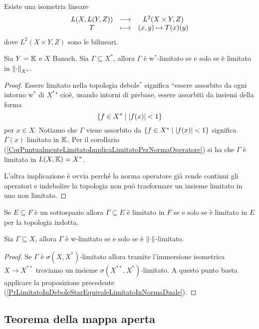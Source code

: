 \begin{exercise}
Esiste una isometria lineare
\[\begin{array}{ccc} {L(X,L(Y,Z))} & \longrightarrow & {L^2(X\times Y,Z)}\\ {T} & \longmapsto & {(x,y)\mapsto T(x)(y)} \end{array}\]
dove $L^2(X\times Y,Z)$ sono le bilineari.
\end{exercise}

\begin{proposition}\label{PrLimitatoInDeboleStarEquivaleLimitatoInNormaDuale}
Sia $Y=\mathbb{K}$ e $X$ Banach. Sia $\Gamma\subseteq X^\ast$, allora $\Gamma$ \`e w$^\ast$-limitato se e solo se \`e limitato in $\left\Vert{\cdot}\right\Vert_{X^\ast}$.
\end{proposition}
\begin{proof}
Essere limitato nella topologia debole$^\ast$ significa ``essere assorbito da ogni intorno w$^\ast$ di $X^\ast$" cio\`e, usando intorni di prebase, essere assorbiti da insiemi della forma
\[\left\{{f\in X^\ast\mid \left|{f(x)}\right|<1}\right\}\]
per $x\in X$. Notiamo che $\Gamma$ viene assorbito da $\left\{{f\in X^\ast\mid \left|{f(x)}\right|<1}\right\}$ significa $\Gamma(x)$ limitato in $\mathbb{K}$. Per il corollario (\ref{CorPuntualmenteLimitatoImplicaLimitatoPerNormaOperatore}) si ha che $\Gamma$ \`e limitato in $L(X,\mathbb{K})=X^\ast$.

L'altra implicazione \`e ovvia perch\'e la norma operatore gi\`a rende continui gli operatori e indebolire la topologia non pu\`o trasformare un insieme limitato in uno non limitato.
\end{proof}

\begin{remark}
Se $E\subseteq F$ \`e un sottospazio allora $\Gamma\subseteq E$ \`e limitato in $F$ se e solo se \`e limitato in $E$ per la topologia indotta.
\end{remark}

\begin{proposition}
Sia $\Gamma\subseteq X$, allora $\Gamma$ \`e w-limitato se e solo se \`e $\left\Vert{\cdot}\right\Vert$-limitato.
\end{proposition}
\begin{proof}
Se $\Gamma$ \`e $\sigma(X,X^\ast)$-limitato allora tramite l'immersione isometrica $X\to X^{\ast\ast}$ troviamo un insieme $\sigma(X^{\ast\ast},X^\ast)$-limitato. A questo punto basta applicare la proposizione precedente (\ref{PrLimitatoInDeboleStarEquivaleLimitatoInNormaDuale}).
\end{proof}

\subsection{Teorema della mappa aperta}

